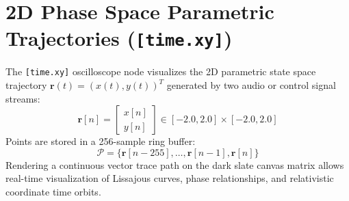 \documentclass[11pt,a4paper]{article}
\begin{document}
\section{2D Phase Space Parametric Trajectories (\texttt{[time.xy]})}
The \texttt{[time.xy]} oscilloscope node visualizes the 2D parametric state space trajectory $\mathbf{r}(t) = (x(t), y(t))^T$ generated by two audio or control signal streams:
\begin{equation}
\mathbf{r}[n] = \begin{bmatrix} x[n] \\ y[n] \end{bmatrix} \in [-2.0, 2.0] \times [-2.0, 2.0]
\end{equation}
Points are stored in a 256-sample ring buffer:
\begin{equation}
\mathcal{P} = \{ \mathbf{r}[n-255], \dots, \mathbf{r}[n-1], \mathbf{r}[n] \}
\end{equation}
Rendering a continuous vector trace path on the dark slate canvas matrix allows real-time visualization of Lissajous curves, phase relationships, and relativistic coordinate time orbits.
\end{document}
